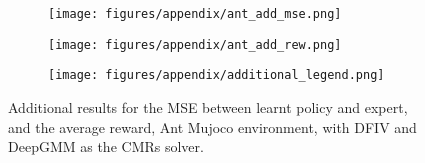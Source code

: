 \begin{figure*}[t]
\begin{subfigure}[c]{0.4\textwidth}
\centering\texttt{[image: figures/appendix/ant\_add\_mse.png]}
\end{subfigure}
\centering
\begin{subfigure}[c]{0.4\textwidth}
\centering
\texttt{[image: figures/appendix/ant\_add\_rew.png]}
\end{subfigure}
\begin{subfigure}[c]{0.1\textwidth}
\centering
\texttt{[image: figures/appendix/additional\_legend.png]}
\end{subfigure}
\vspace{-8pt}
\caption{Additional results for the MSE between learnt policy and expert, and the average reward, Ant Mujoco environment, with DFIV and DeepGMM as the CMRs solver.}
\label{fig:additional_ant}
\end{figure*}
